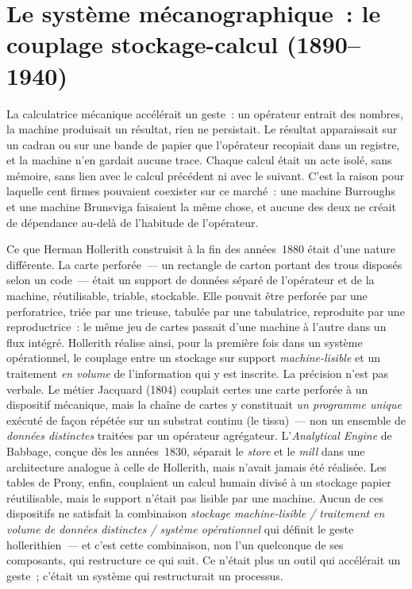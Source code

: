 \section{Le système mécanographique~: le couplage stockage-calcul (1890--1940)}\label{sec:mechanography}

La calculatrice mécanique accélérait un geste~: un opérateur entrait des nombres, la machine produisait un résultat, rien ne persistait. Le résultat apparaissait sur un cadran ou sur une bande de papier que l'opérateur recopiait dans un registre, et la machine n'en gardait aucune trace. Chaque calcul était un acte isolé, sans mémoire, sans lien avec le calcul précédent ni avec le suivant. C'est la raison pour laquelle cent firmes pouvaient coexister sur ce marché~: une machine Burroughs et une machine Brunsviga faisaient la même chose, et aucune des deux ne créait de dépendance au-delà de l'habitude de l'opérateur.

Ce que Herman Hollerith construisit à la fin des années~1880 était d'une nature différente. La carte perforée~--- un rectangle de carton portant des trous disposés selon un code~--- était un support de données séparé de l'opérateur et de la machine, réutilisable, triable, stockable. Elle pouvait être perforée par une perforatrice, triée par une trieuse, tabulée par une tabulatrice, reproduite par une reproductrice~: le même jeu de cartes passait d'une machine à l'autre dans un flux intégré. Hollerith réalise ainsi, pour la première fois dans un système opérationnel, le couplage entre un stockage sur support \emph{machine-lisible} et un traitement \emph{en volume} de l'information qui y est inscrite. La précision n'est pas verbale. Le métier Jacquard (1804) couplait certes une carte perforée à un dispositif mécanique, mais la chaîne de cartes y constituait \emph{un programme unique} exécuté de façon répétée sur un substrat continu (le tissu)~--- non un ensemble de \emph{données distinctes} traitées par un opérateur agrégateur. L'\emph{Analytical Engine} de Babbage, conçue dès les années~1830, séparait le \emph{store} et le \emph{mill} dans une architecture analogue à celle de Hollerith, mais n'avait jamais été réalisée. Les tables de Prony, enfin, couplaient un calcul humain divisé à un stockage papier réutilisable, mais le support n'était pas lisible par une machine. Aucun de ces dispositifs ne satisfait la combinaison \emph{stockage machine-lisible / traitement en volume de données distinctes / système opérationnel} qui définit le geste hollerithien~--- et c'est cette combinaison, non l'un quelconque de ses composants, qui restructure ce qui suit. Ce n'était plus un outil qui accélérait un geste~; c'était un système qui restructurait un processus.

